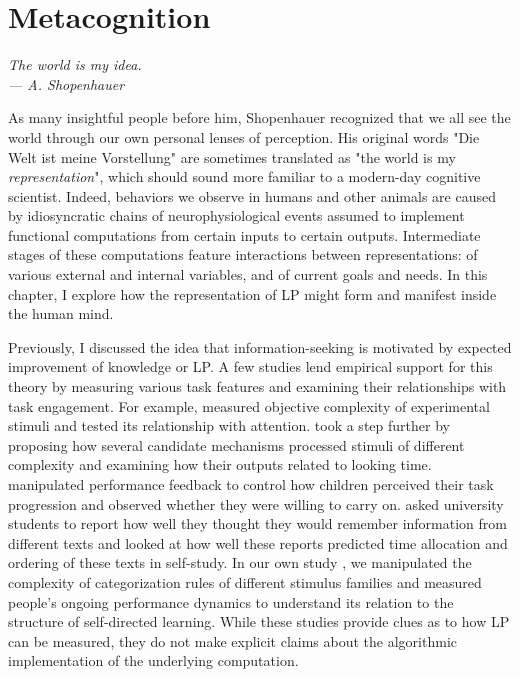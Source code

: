 \chapter{Metacognition}\label{CH5}

\begin{flushright}{\slshape
    The world is my idea. \\
    --- A. Shopenhauer \citeyear{schopenhauer_world_2016}}
\end{flushright}
As many insightful people before him, Shopenhauer recognized that we all see the world through our own personal lenses of perception. His original words "Die Welt ist meine Vorstellung" are sometimes translated as "the world is my \emph{representation}", which should sound more familiar to a modern-day cognitive scientist. Indeed, behaviors we observe in humans and other animals are caused by idiosyncratic chains of neurophysiological events assumed to implement functional computations from certain inputs to certain outputs. Intermediate stages of these computations feature interactions between representations: of various external and internal variables, and of current goals and needs. In this chapter, I explore how the representation of \acf{LP} might form and manifest inside the human mind. 

Previously, I discussed the idea that information-seeking is motivated by expected improvement of knowledge or \ac{LP}. A few studies lend empirical support for this theory by measuring various task features and examining their relationships with task engagement. For example, \citeauthor{gerken_infants_2011} \citeyearpar{gerken_infants_2011} measured objective complexity of experimental stimuli and tested its relationship with attention. \citeauthor{poli_infants_2020} \citeyearpar{poli_infants_2020} took a step further by proposing how several candidate mechanisms processed stimuli of different complexity and examining how their outputs related to looking time. \citeauthor{leonard_young_2021} \citeyearpar{leonard_young_2021} manipulated performance feedback to control how children perceived their task progression and observed whether they were willing to carry on. \citeauthor{son_metacognitive_2000} \citeyearpar{son_metacognitive_2000} asked university students to report how well they thought they would remember information from different texts and looked at how well these reports predicted time allocation and ordering of these texts in self-study. In our own study \parencite{ten_humans_2021}, we manipulated the complexity of categorization rules of different stimulus families and measured people's ongoing performance dynamics to understand its relation to the structure of self-directed learning. While these studies provide clues as to how \ac{LP} can be measured, they do not make explicit claims about the algorithmic implementation of the underlying computation.

